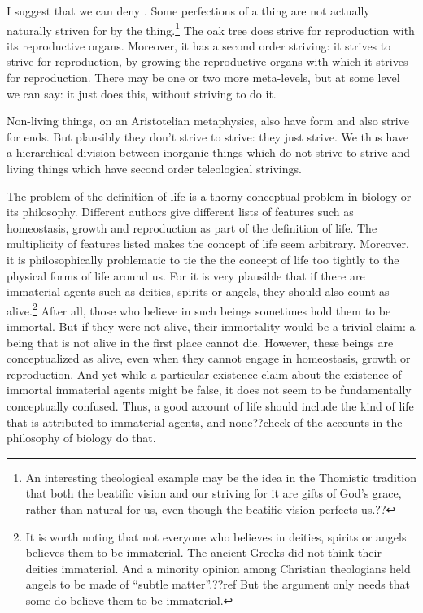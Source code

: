 I suggest that we can deny . Some perfections of a thing are not actually naturally striven for by the thing.\footnote{An interesting
theological example may be the idea in the Thomistic tradition that both the beatific vision and our striving for it are gifts of God's grace, rather than
natural for us, even though the beatific vision perfects us.??} The oak tree does strive for reproduction with its reproductive organs. Moreover, it has a 
second order striving: it strives to strive for reproduction, by growing the reproductive organs with which it strives for reproduction. There may be one or
two more meta-levels, but at some level we can say: it just does this, without striving to do it.

Non-living things, on an Aristotelian metaphysics, also have form and also strive for ends. But plausibly they don't strive to strive: they just strive. 
We thus have a hierarchical division between inorganic things which do not strive to strive and living things which have second order teleological strivings.

The problem of the definition of life is a thorny conceptual problem in biology or its philosophy. Different authors give different lists of features such 
as homeostasis, growth and reproduction as part of the definition of life. The multiplicity of features listed makes the concept of life seem arbitrary.
Moreover, it is philosophically problematic to tie the the concept of life too tightly to the physical forms of life around us. For it is very plausible
that if there are immaterial agents such as deities, spirits or angels, they should also count as alive.\footnote{It is worth noting that not everyone who
believes in deities, spirits or angels believes them to be immaterial. The ancient Greeks did not think their deities immaterial. And a minority opinion
among Christian theologians held angels to be made of ``subtle matter''.??ref But the argument only needs that some do believe them to be immaterial.}
 After all, those who believe in such beings sometimes 
hold them to be immortal. But if they were not alive, their immortality would be a trivial claim: a being that is not alive in the first place cannot die. 
However, these beings are conceptualized as alive, even when they cannot engage in homeostasis, growth or reproduction. And yet while a particular existence
claim about the existence of immortal immaterial agents might be false, it does not seem to be fundamentally conceptually confused. Thus, a good account
of life should include the kind of life that is attributed to immaterial agents, and none??check of the accounts in the philosophy of biology do that.

